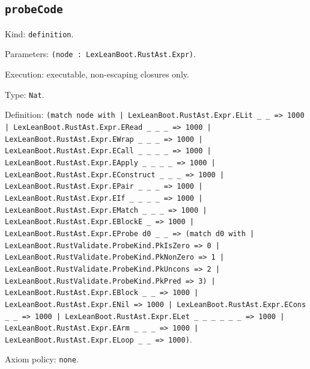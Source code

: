 \documentclass[11pt]{article}
\begin{document}
\subsection*{\texttt{probeCode}}
\noindent Kind: \texttt{definition}.\par
\noindent Parameters: \texttt{(node : LexLeanBoot.RustAst.Expr)}.\par
\noindent Execution: executable, non-escaping closures only.\par
\noindent Type: \texttt{Nat}.\par
\noindent Definition: \texttt{(match node with | LexLeanBoot.RustAst.Expr.ELit \_ \_ => 1000 | LexLeanBoot.RustAst.Expr.ERead \_ \_ \_ => 1000 | LexLeanBoot.RustAst.Expr.EWrap \_ \_ \_ => 1000 | LexLeanBoot.RustAst.Expr.ECall \_ \_ \_ \_ => 1000 | LexLeanBoot.RustAst.Expr.EApply \_ \_ \_ \_ => 1000 | LexLeanBoot.RustAst.Expr.EConstruct \_ \_ \_ => 1000 | LexLeanBoot.RustAst.Expr.EPair \_ \_ \_ => 1000 | LexLeanBoot.RustAst.Expr.EIf \_ \_ \_ \_ => 1000 | LexLeanBoot.RustAst.Expr.EMatch \_ \_ \_ => 1000 | LexLeanBoot.RustAst.Expr.EBlockE \_ => 1000 | LexLeanBoot.RustAst.Expr.EProbe d0 \_ \_ => (match d0 with | LexLeanBoot.RustValidate.ProbeKind.PkIsZero => 0 | LexLeanBoot.RustValidate.ProbeKind.PkNonZero => 1 | LexLeanBoot.RustValidate.ProbeKind.PkUncons => 2 | LexLeanBoot.RustValidate.ProbeKind.PkPred => 3) | LexLeanBoot.RustAst.Expr.EBlock \_ \_ => 1000 | LexLeanBoot.RustAst.Expr.ENil => 1000 | LexLeanBoot.RustAst.Expr.ECons \_ \_ => 1000 | LexLeanBoot.RustAst.Expr.ELet \_ \_ \_ \_ \_ \_ => 1000 | LexLeanBoot.RustAst.Expr.EArm \_ \_ \_ => 1000 | LexLeanBoot.RustAst.Expr.ELoop \_ \_ => 1000)}.\par
\noindent Axiom policy: \texttt{none}.\par
\end{document}
